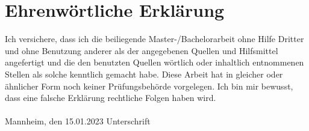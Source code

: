 \documentclass[11pt,titlepage,oneside,openany]{book}
\begin{document}
\newpage


\pagestyle{empty}


\section*{Ehrenw\"ortliche Erkl\"arung}
Ich versichere, dass ich die beiliegende Master-/Bachelorarbeit ohne Hilfe Dritter
und ohne Benutzung anderer als der angegebenen Quellen und Hilfsmittel
angefertigt und die den benutzten Quellen w\"ortlich oder inhaltlich
entnommenen Stellen als solche kenntlich gemacht habe. Diese Arbeit
hat in gleicher oder \"ahnlicher Form noch keiner Pr\"ufungsbeh\"orde
vorgelegen. Ich bin mir bewusst, dass eine falsche Erkl\"arung rechtliche Folgen haben
wird.
\\
\\

\noindent
Mannheim, den 15.01.2023 \hspace{4cm} Unterschrift
\end{document}
